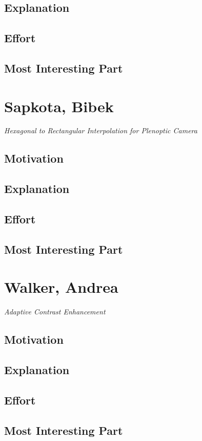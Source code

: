 \documentclass[12pt]{article}
\begin{document}
\subsection{Explanation}

\subsection{Effort}

\subsection{Most Interesting Part}

\newpage
\section{Sapkota, Bibek}

\textit{Hexagonal to Rectangular Interpolation for Plenoptic Camera}

\subsection{Motivation}

\subsection{Explanation}

\subsection{Effort}

\subsection{Most Interesting Part}

\newpage
\section{Walker, Andrea}

\textit{Adaptive Contrast Enhancement}

\subsection{Motivation}

\subsection{Explanation}

\subsection{Effort}

\subsection{Most Interesting Part}
\end{document}
